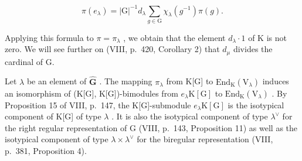 \[
\pi (e _ {\lambda}) = | \mathrm{G} | ^ {- 1} d _ {\lambda} \sum_ {g \in \mathrm{G}} \chi_ {\lambda} (g ^ {- 1}) \pi (g).\tag{19}
\]

Applying this formula to \(\pi = \pi_{\lambda}\) , we obtain that the element \(d_{\lambda} \cdot 1\) of K is not zero. We will see further on (VIII, p.~420, Corollary 2) that \(d_{\mu}\) divides the cardinal of G.

Let \(\lambda\) be an element of \(\widehat{\mathbf{G}}\) . The mapping \(\pi_{\lambda}\) from K{[}G{]} to \(\mathrm{End}_{\mathrm{K}}(\mathrm{V}_{\lambda})\) induces an isomorphism of (K{[}G{]}, K{[}G{]})-bimodules from \(e_{\lambda}\mathrm{K}[\mathrm{G}]\) to \(\mathrm{End}_{\mathrm{K}}(\mathrm{V}_{\lambda})\) . By Proposition 15 of VIII, p.~147, the K{[}G{]}-submodule \(e_{\lambda}\mathrm{K}[\mathrm{G}]\) is the isotypical component of K{[}G{]} of type \(\lambda\) . It is also the isotypical component of type \(\lambda^{\vee}\) for the right regular representation of G (VIII, p.~143, Proposition 11) as well as the isotypical component of type \(\lambda \times \lambda^{\vee}\) for the biregular representation (VIII, p.~381, Proposition 4).


